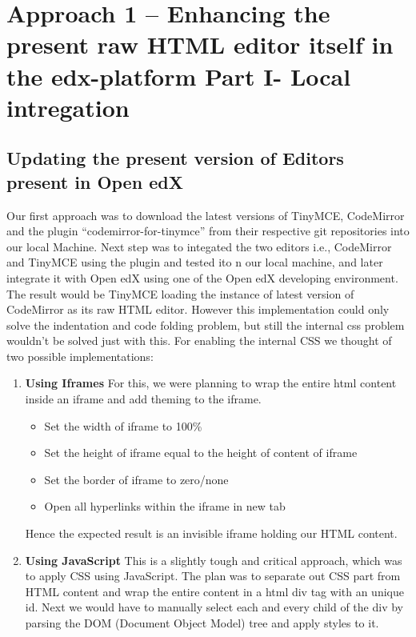 
\chapter{Approach 1 – Enhancing the present raw HTML editor itself
in the edx-platform Part I- Local intregation}
\section{Updating the present version of Editors present in Open edX}
Our first approach was to download the latest versions of TinyMCE, CodeMirror and
the plugin “codemirror-for-tinymce” from their respective git repositories into our local
Machine.\newline
Next step was to integated the two editors i.e., CodeMirror and TinyMCE using the plugin and
tested ito n our local machine, and later integrate it with Open edX using one of the Open edX developing
environment.\newline
The result would be TinyMCE loading the instance of latest version of CodeMirror as its
raw HTML editor.
However this implementation could only solve the indentation and code folding problem,
but still the internal css problem wouldn’t be solved just with this.\newline\newline
For enabling the internal CSS we thought of two possible implementations:
\begin{enumerate}
\item\textbf{Using Iframes}\newline
For this, we were planning to wrap the entire html content inside an iframe
and add theming to the iframe.
\begin{itemize}
\item Set the width of iframe to 100\%
\item Set the height of iframe equal to the height of content of iframe
\item Set the border of iframe to zero/none
\item Open all hyperlinks within the iframe in new tab
\end{itemize}
Hence the expected result is an invisible iframe holding our HTML content.



\item\textbf{Using JavaScript}\newline
This is a slightly tough and critical approach, which was to apply CSS using
JavaScript. The plan was to separate out CSS part from HTML content and
wrap the entire content in a html div tag with an unique id.
Next we would have to manually select each and every child of the div by
parsing the DOM (Document Object Model) tree and apply styles to it.\newline
\end{enumerate}

